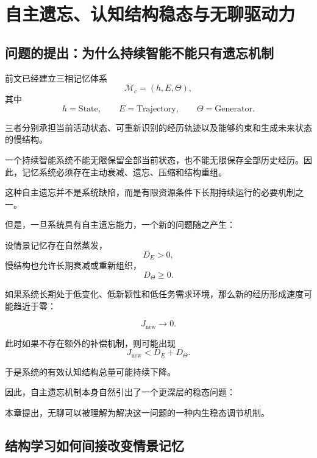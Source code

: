 \chapter{自主遗忘、认知结构稳态与无聊驱动力}

\section{问题的提出：为什么持续智能不能只有遗忘机制}

前文已经建立三相记忆体系
\[
\mathcal{M}_c=(h,E,\Theta),
\]
其中
\[
h=\mathrm{State},
\qquad
E=\mathrm{Trajectory},
\qquad
\Theta=\mathrm{Generator}.
\]

三者分别承担当前活动状态、可重新识别的经历轨迹以及能够约束和生成未来状态的慢结构。

一个持续智能系统不能无限保留全部当前状态，也不能无限保存全部历史经历。因此，记忆系统必须存在主动衰减、遗忘、压缩和结构重组。

这种自主遗忘并不是系统缺陷，而是有限资源条件下长期持续运行的必要机制之一。

但是，一旦系统具有自主遗忘能力，一个新的问题随之产生：

\begin{statementbox}
\centering
{}
\end{statementbox}

设情景记忆存在自然蒸发，
\[
D_E>0,
\]
慢结构也允许长期衰减或重新组织，
\[
D_\Theta\geq 0.
\]

如果系统长期处于低变化、低新颖性和低任务需求环境，那么新的经历形成速度可能趋近于零：

\[
J_{\mathrm{new}}\rightarrow 0.
\]

此时如果不存在额外的补偿机制，则可能出现
\[
J_{\mathrm{new}}
<
D_E+D_\Theta.
\]

于是系统的有效认知结构总量可能持续下降。

因此，自主遗忘机制本身自然引出了一个更深层的稳态问题：

\begin{statementbox}
\centering
{}
\end{statementbox}

本章提出，无聊可以被理解为解决这一问题的一种内生稳态调节机制。

\section{结构学习如何间接改变情景记忆}

